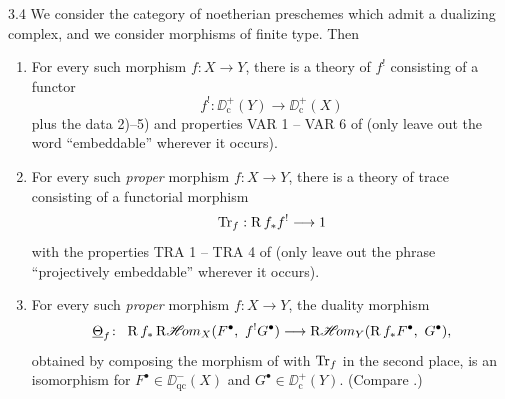\begin{bookcorollary}{3.4}\label{cor:7.3.4}
We consider the category of noetherian preschemes which admit a dualizing complex, and we consider morphisms of finite type. Then

\begin{enumerate}
\item[(a)] For every such morphism $f: X \to Y$, there is a theory of $f^{!}$ consisting of a functor
\[
f^{!}: \DD_{\mathrm{c}}^{+}(Y) \longrightarrow \DD_{\mathrm{c}}^{+}(X)
\]
plus the data 2)--5) and properties VAR 1 -- VAR 6 of  (only leave out the word ``embeddable'' wherever it occurs).

\item[(b)] For every such \emph{proper} morphism $f: X \to Y$, there is a theory of trace consisting of a functorial morphism
\[
\operatorname{Tr}_{f} : \operatorname{R} f_{*} f^{!} \longrightarrow 1
\]
with the properties TRA 1 -- TRA 4 of  (only leave out the phrase ``projectively embeddable'' wherever it occurs).

\item[(c)] For every such \emph{proper} morphism $f: X \to Y$, the duality morphism
\[
\underline{\Theta}_{f} \colon \ \RR f_{*} \RsheafHom_X(F^{\bullet},\ f^{!}G^{\bullet}) \longrightarrow \RsheafHom_Y(\RR f_{*}F^{\bullet},\ G^{\bullet}),
\]
obtained by composing the morphism of  with $\operatorname{Tr}_{f}$ in the second place, is an isomorphism for $F^{\bullet} \in \DD_{\mathrm{qc}}^{-}(X)$ and $G^{\bullet} \in \DD_{\mathrm{c}}^{+}(Y)$. (Compare .)
\end{enumerate}
\end{bookcorollary}

